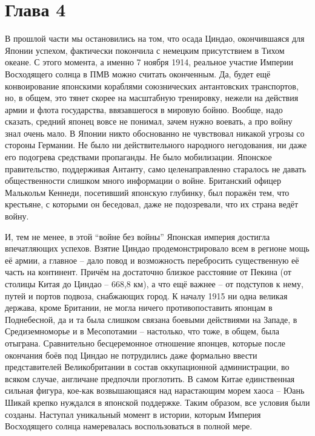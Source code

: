 \chapter{Глава 4}

В прошлой части мы остановились на том, что осада Циндао, окончившаяся для Японии успехом, фактически покончила с немецким присутствием в Тихом океане. С этого момента, а именно 7 ноября 1914, реальное участие Империи Восходящего солнца в ПМВ можно считать оконченным. Да, будет ещё конвоирование японскими кораблями союзнических антантовских транспортов, но, в общем, это тянет скорее на масштабную тренировку, нежели на действия армии и флота государства, ввязавшегося в мировую бойню. Вообще, надо сказать, средний японец вовсе не понимал, зачем нужно воевать, а про войну знал очень мало. В Японии никто обоснованно не чувствовал никакой угрозы со стороны Германии. Не было ни действительного народного негодования, ни даже его подогрева средствами пропаганды. Не было мобилизации. Японское правительство, поддерживая Антанту, само целенаправленно старалось не давать общественности слишком много информации о войне. Британский офицер Малькольм Кеннеди, посетивший японскую глубинку, был поражён тем, что крестьяне, с которыми он беседовал, даже не подозревали, что их страна ведёт войну.

И, тем не менее, в этой “войне без войны” Японская империя достигла впечатляющих успехов. Взятие Циндао продемонстрировало всем в регионе мощь её армии, а главное – дало повод и возможность перебросить существенную её часть на континент. Причём на достаточно близкое расстояние от Пекина (от столицы Китая до Циндао – 668,8 км), а что ещё важнее – от подступов к нему, путей и портов подвоза, снабжающих город. К началу 1915 ни одна великая держава, кроме Британии, не могла ничего противопоставить японцам в Поднебесной, да и та была слишком связана боевыми действиями на Западе, в Средиземноморье и в Месопотамии – настолько, что тоже, в общем, была отыграна. Сравнительно бесцеремонное отношение японцев, которые после окончания боёв под Циндао не потрудились даже формально ввести представителей Великобритании в состав оккупационной администрации, во всяком случае, англичане предпочли проглотить. В самом Китае единственная сильная фигура, кое-как возвышающаяся над нарастающим морем хаоса – Юань Шикай крепко нуждался в японской поддержке. Таким образом, все условия были созданы. Наступал уникальный момент в истории, которым Империя Восходящего солнца намеревалась воспользоваться в полной мере.

